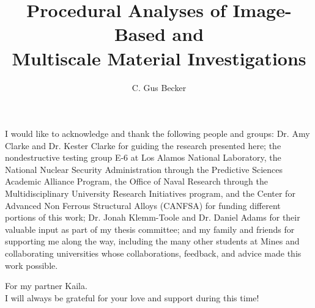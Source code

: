 \documentclass[letterpaper,12pt]{article} %
\title{
    Procedural Analyses of Image-Based and\\
    Multiscale Material Investigations
}
\author{C. Gus Becker}                           %
\begin{document}

\frontmatter                       %
\maketitle\newpage                 %
\makecopyright{\the\year}\newpage  %
\makesubmittal\newpage             %

\begin{abstract}

\end{abstract} \newpage

\tableofcontents\newpage        %
\listoffigures\newpage          %
\listoftables\newpage           %

\begin{acknowledgments}
I would like to acknowledge and thank the following people and groups:
Dr. Amy Clarke and Dr. Kester
Clarke for guiding the research presented here;
the nondestructive testing group E-6 at Los Alamos National Laboratory,
the National Nuclear Security Administration through the Predictive
Sciences Academic Alliance Program, the Office of Naval Research through
the Multidisciplinary University Research Initiatives program,
and the Center for Advanced Non Ferrous Structural Alloys (CANFSA)
for funding different portions of this work;
Dr. Jonah Klemm-Toole and Dr. Daniel Adams for their valuable input
as part of my thesis committee;
and my family and friends for supporting me along the way,
including the many other students at Mines and collaborating universities
whose collaborations, feedback, and advice made this work possible.
\end{acknowledgments} \newpage

\begin{dedication}
For my partner Kaila.\\
I will always be grateful for your love and support during this time!
\end{dedication}\newpage
\end{document}
